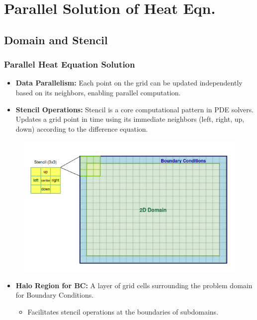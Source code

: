 \documentclass[9pt]{beamer}
\begin{document}
\section{Parallel Solution of Heat Eqn.}

\subsection{Domain and Stencil}
\begin{frame}
\frametitle{Parallel Heat Equation Solution}
\vspace{-0.5\baselineskip}
\scriptsize
    \begin{itemize}
        \item \textbf{Data Parallelism:} Each point on the grid can be updated independently based on its neighbors, enabling parallel computation.
        \item \textbf{Stencil Operations:} Stencil is a core computational pattern in PDE solvers. Updates a grid point in time using its immediate neighbors (left, right, up, down) according to the difference equation.
    \end{itemize}
    \vspace{-0.5\baselineskip}
    \begin{figure}
        \centering
        \includegraphics[width=0.6\linewidth]{Screenshot from 2024-08-30 14-18-30.png}
        \label{fig:enter-label}
    \end{figure}
    \begin{itemize}
        \item \textbf{Halo Region for BC:} A layer of grid cells surrounding the problem domain for Boundary Conditions.
        \begin{itemize}
            \item Facilitates stencil operations at the boundaries of subdomains.
        \end{itemize}
    \end{itemize}
\end{frame}
\end{document}
